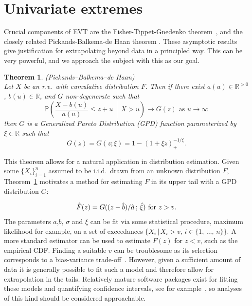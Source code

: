 \documentclass[11pt,twoside,openany]{book}
\newcommand{\reals}{\mathbb{R}}
\newtheorem{Theorem}{Theorem}
\numberwithin{Theorem}{chapter}
\numberwithin{Definition}{chapter}
\numberwithin{Lemma}{chapter}
\numberwithin{Algorithm}{chapter}
\numberwithin{equation}{chapter}
\begin{document}
\section{Univariate extremes}

Crucial components of EVT are the
Fisher-Tippet-Gnedenko theorem~\citep{coles2001introduction}, and the closely
related Pickands-Balkema-de Haan
theorem \citep{balkema1974residual,pickands1975statistical}. These
asymptotic results give justification for extrapolating beyond data
in a principled way. This can be
very powerful, and we approach the subject with this as our goal.

\begin{Theorem}{(Pickands–Balkema–de Haan)}
  \label{thm:pbdhtheorem}\\
  Let $X$ be an r.v.\ with cumulative distribution $F$.
  Then if there exist $a(u) \in \mathbb{R}^{>0}$, $b(u)\in\mathbb{R}$,
  and $G$ non-degenerate such that
  \[
    \mathbb{P}\left(\frac{X - b(u)}{a(u)}\leq z + u\,\middle|\,X>u\right)\rightarrow G(z)
    \text{ as }{u\rightarrow \infty}
  \]
  then $G$ is a Generalized Pareto Distribution (GPD) function parameterized
  by $\xi \in \reals$ such that
  \[
    G(z) = G(z;\xi)= 1 - \left(1 + \xi z\right)_{+}^{-1/\xi}.
  \]

\end{Theorem}

This theorem
allows for a natural application in distribution estimation. Given
some $\{X_i\}_{i=1}^n$ assumed to be i.i.d.\ drawn from an unknown distribution
$F$, Theorem~\ref{thm:pbdhtheorem} motivates a method for estimating $F$ in
its upper tail with a GPD distribution $G$:


\begin{equation}\label{eq:fhat_univariate}
  \hat F(z) = G((z - \hat b)/\hat a\,;\, \hat\xi)  \text{ for } z > v.\\
  \end{equation}
The parameters $a$,$b$, $\sigma$ and $\xi$ can be fit via some statistical procedure,
maximum likelihood for example, on a set of exceedances $\{X_i\,|\, X_i > v,\,i\in\{1,\,\ldots,\,n\}\}$.
A more standard estimator can be used to estimate $F(z)$ for $z < v$, such as
the empirical CDF.
Finding a suitable $v$ can be troublesome
as its selection corresponds to a bias-variance trade-off~\citep{coles2001introduction}.
However, given a sufficient amount of data it is generally possible to
fit such a model and therefore allow for extrapolation in the tails.
Relatively mature software packages exist for fitting these models and quantifying confidence
intervals, see for example~\cite{mev}, so analyses of this kind should be considered
approachable.
\end{document}

